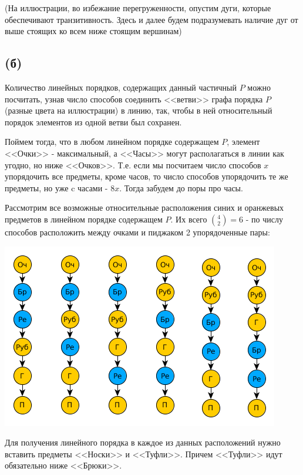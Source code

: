 \documentclass{article}
\begin{document}
	(На иллюстрации, во избежание перегруженности, опустим дуги, которые обеспечивают транзитивность. Здесь и далее будем подразумевать наличие дуг от выше стоящих ко всем ниже стоящим вершинам)
	
	\subsection{(б)}
	
	Количество линейных порядков, содержащих данный частичный  $P$ можно посчитать, узнав число способов соединить <<ветви>> графа порядка $P$ (разные цвета на иллюстрации) в линию, так, чтобы в ней относительный порядок элементов из одной ветви был сохранен.
	
	Поймем тогда, что в любом линейном порядке содержащем $P$, элемент <<Очки>> - максимальный, а <<Часы>> могут располагаться в линии как угодно, но ниже <<Очков>>. Т.е. если мы посчитаем число способов $x$ упорядочить все предметы, кроме часов, то число способов упорядочить те же предметы, но уже c часами - $8x$. Тогда забудем до поры про часы.
	
	Рассмотрим все возможные относительные расположения синих и оранжевых предметов в линейном порядке содержащем $P$. Их всего ${4 \choose 2} = 6$ - по числу способов расположить между очками и пиджаком 2 упорядоченные пары:
	
	\begin{center}
		\includegraphics[scale=0.5]{1_3}
	\end{center}

	Для получения линейного порядка в каждое из данных расположений нужно вставить предметы <<Носки>> и <<Туфли>>. Причем <<Туфли>> идут обязательно ниже <<Брюки>>.
	
\end{document}
